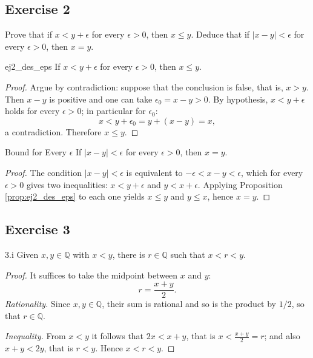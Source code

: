 \documentclass[11pt, a4paper]{article}
\begin{document}
\subsection*{Exercise 2}

Prove that if $x < y + \epsilon$ for every $\epsilon > 0$, then $x \le y$. Deduce that if
$|x - y| < \epsilon$ for every $\epsilon > 0$, then $x = y$.

\begin{proposicion}{}{ej2_des_eps}
If $x < y + \epsilon$ for every $\epsilon > 0$, then $x \le y$.
\end{proposicion}

\begin{proof}
Argue by contradiction: suppose that the conclusion is false, that is, $x > y$. Then $x - y$
is positive and one can take $\epsilon_0 = x - y > 0$. By hypothesis, $x < y + \epsilon$ holds for
every $\epsilon > 0$; in particular for $\epsilon_0$:
$$ x < y + \epsilon_0 = y + (x - y) = x, $$
a contradiction. Therefore $x \le y$.
\end{proof}

\begin{corolario}{Bound for Every $\epsilon$}{}
If $|x - y| < \epsilon$ for every $\epsilon > 0$, then $x = y$.
\end{corolario}

\begin{proof}
The condition $|x - y| < \epsilon$ is equivalent to $-\epsilon < x - y < \epsilon$, which for every
$\epsilon > 0$ gives two inequalities: $x < y + \epsilon$ and $y < x + \epsilon$. Applying
Proposition \ref{prop:ej2_des_eps} to each one yields $x \le y$ and $y \le x$, hence $x = y$.
\end{proof}

\subsection*{Exercise 3}

\begin{proposicion}{3.i}{}
Given $x, y \in \mathbb{Q}$ with $x < y$, there is $r \in \mathbb{Q}$ such that $x < r < y$.
\end{proposicion}

\begin{proof}
It suffices to take the midpoint between $x$ and $y$:
$$ r = \frac{x + y}{2}. $$
\textit{Rationality.} Since $x, y \in \mathbb{Q}$, their sum is rational and so is the product by $1/2$,
so that $r \in \mathbb{Q}$.

\textit{Inequality.} From $x < y$ it follows that $2x < x + y$, that is $x < \frac{x+y}{2} = r$; and also
$x + y < 2y$, that is $r < y$. Hence $x < r < y$.
\end{proof}
\end{document}
